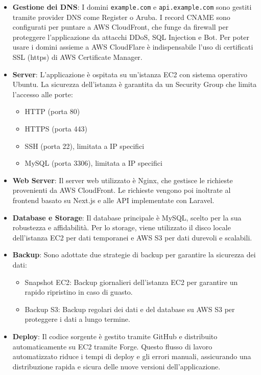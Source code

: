 \begin{itemize}
    \item \textbf{Gestione dei DNS}: I domini \texttt{example.com} e \texttt{api.example.com} sono gestiti tramite provider DNS come Register o Aruba. I record CNAME sono configurati per puntare a AWS CloudFront, che funge da firewall per proteggere l'applicazione da attacchi DDoS, SQL Injection e Bot. Per poter usare i domini assieme a AWS CloudFlare è indispensabile l'uso di certificati SSL (https) di AWS Certificate Manager.
 
    \item \textbf{Server}: L'applicazione è ospitata su un'istanza EC2 con sistema operativo Ubuntu. La sicurezza dell'istanza è garantita da un Security Group che limita l'accesso alle porte:
    \begin{itemize}
        \item HTTP (porta 80)
        \item HTTPS (porta 443)
        \item SSH (porta 22), limitata a IP specifici
        \item MySQL (porta 3306), limitata a IP specifici
    \end{itemize}
    
    \item \textbf{Web Server}: Il server web utilizzato è Nginx, che gestisce le richieste provenienti da AWS CloudFront. Le richieste vengono poi inoltrate al frontend basato su Next.js e alle API implementate con Laravel.

    \item \textbf{Database e Storage}: Il database principale è MySQL, scelto per la sua robustezza e affidabilità. Per lo storage, viene utilizzato il disco locale dell'istanza EC2 per dati temporanei e AWS S3 per dati durevoli e scalabili.

    \item \textbf{Backup}: Sono adottate due strategie di backup per garantire la sicurezza dei dati:
    \begin{itemize}
        \item Snapshot EC2: Backup giornalieri dell'istanza EC2 per garantire un rapido ripristino in caso di guasto.
        \item Backup S3: Backup regolari dei dati e del database su AWS S3 per proteggere i dati a lungo termine.
    \end{itemize}
    
    \item \textbf{Deploy}: Il codice sorgente è gestito tramite GitHub e distribuito automaticamente su EC2 tramite Forge. Questo flusso di lavoro automatizzato riduce i tempi di deploy e gli errori manuali, assicurando una distribuzione rapida e sicura delle nuove versioni dell'applicazione.
\end{itemize}